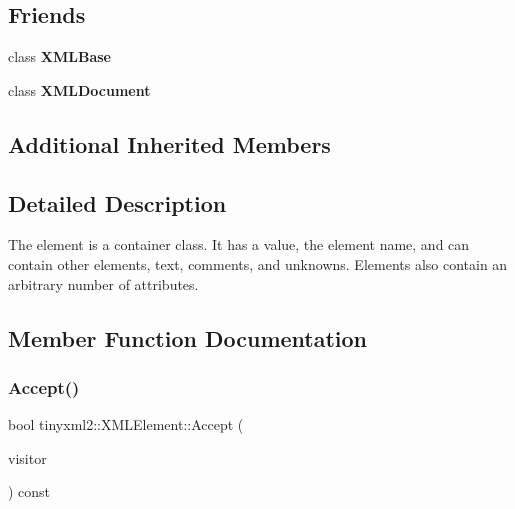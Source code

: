 \subsection*{Friends}
\begin{DoxyCompactItemize}
\item 
\mbox{\label{classtinyxml2_1_1XMLElement_aaa44c4bd0693de6cd00d57cb21e81410}} 
class {\bfseries X\+M\+L\+Base}
\item 
\mbox{\label{classtinyxml2_1_1XMLElement_a0a577a5e971b59b321cae12e5b61df55}} 
class {\bfseries X\+M\+L\+Document}
\end{DoxyCompactItemize}
\subsection*{Additional Inherited Members}


\subsection{Detailed Description}
The element is a container class. It has a value, the element name, and can contain other elements, text, comments, and unknowns. Elements also contain an arbitrary number of attributes. 

\subsection{Member Function Documentation}
\mbox{\label{classtinyxml2_1_1XMLElement_a9b2119831e8b85827d5d3e5076788e4a}} 
\subsubsection{\texorpdfstring{Accept()}{Accept()}\hspace{0.1cm}{\footnotesize\ttfamily [1/2]}}
{\footnotesize\ttfamily bool tinyxml2\+::\+X\+M\+L\+Element\+::\+Accept (\begin{DoxyParamCaption}\item[{\hyperlink{classtinyxml2_1_1XMLVisitor}{X\+M\+L\+Visitor} $\ast$}]{visitor }\end{DoxyParamCaption}) const\hspace{0.3cm}{\ttfamily [virtual]}}

